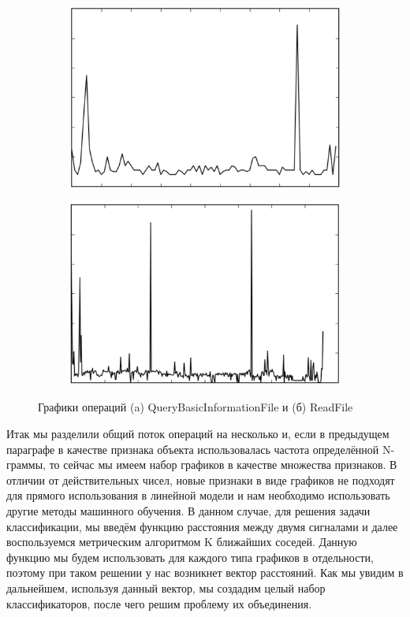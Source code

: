\begin{figure}[ht]
	\centering
    \begin{subfigure}[b]{0.40\textwidth}
    \centering
        \includegraphics[scale=0.25]{pasted-image-31.png}
        \caption{}
    \end{subfigure}
 	\begin{subfigure}[b]{0.40\textwidth}
    \centering
        \includegraphics[scale=0.25]{pasted-image-33.png}
        \caption{}
    \end{subfigure}
    \caption{Графики операций (a) QueryBasicInformationFile и (б) ReadFile}
    \label{fig_parsetree}
\end{figure}

Итак мы разделили общий поток операций на несколько и, если в предыдущем параграфе в качестве признака объекта использовалась частота определённой N-граммы, то сейчас мы имеем набор графиков в качестве множества признаков. В отличии от действительных чисел, новые признаки в виде графиков не подходят для прямого использования в линейной модели и нам необходимо использовать другие методы машинного обучения. В данном случае, для решения задачи классификации, мы введём функцию расстояния между двумя сигналами и далее воспользуемся метрическим алгоритмом K ближайших соседей. Данную функцию мы будем использовать для каждого типа графиков в отдельности, поэтому при таком решении у нас возникнет вектор расстояний. Как мы увидим в дальнейшем, используя данный вектор, мы создадим целый набор классификаторов, после чего решим проблему их объединения.

